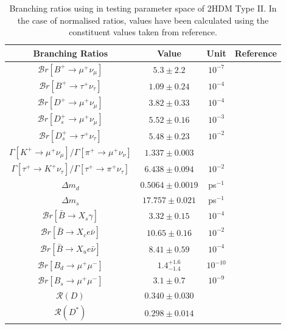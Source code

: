 \documentclass[a4paper,12pt]{article}
\begin{document}
\begin{table}[ht]
    \centering
    \begin{tabular}{c|ccc}
        \hline\hline
        Branching Ratios & Value & Unit & Reference \\
        \hline\hline
        $\mathcal{B}r[B^+\to\mu^+\nu_\mu]$ & $5.3\pm2.2$ & $10^{-7}$ & \\
        $\mathcal{B}r[B^+\to\tau^+\nu_\tau]$ & $1.09\pm0.24$ & $10^{-4}$ & \cite{pdg} \\
        $\mathcal{B}r[D^+\to\mu^+\nu_\mu]$ & $3.82\pm0.33$ & $10^{-4}$ & \cite{pdg} \\
        $\mathcal{B}r[D_s^+\to\mu^+\nu_\mu]$ & $5.52\pm0.16$ & $10^{-3}$ & \cite{pdg} \\
        $\mathcal{B}r[D_s^+\to\tau^+\nu_\tau]$ & $5.48\pm0.23$ & $10^{-2}$ & \cite{pdg} \\
        $\Gamma[K^+\to\mu^+\nu_\mu]/\Gamma[\pi^+\to\mu^+\nu_\nu]$ & $1.337\pm0.003$ & & \cite{pdg}\\
        $\Gamma[\tau^+\to K^+\nu_\tau]/\Gamma[\tau^+\to\pi^+\nu_\tau]$ & $6.438\pm0.094$ & $10^{-2}$ & \cite{pdg} \\
        $\Delta m_d$ & $0.5064\pm0.0019$ & ps$^{-1}$ & \cite{hflav} \\ 
        $\Delta m_s$ & $17.757\pm0.021$ & ps$^{-1}$ & \cite{hflav} \\
        $\mathcal{B}r[\bar{B}\to X_s\gamma]$ & $3.32\pm0.15$ & $10^{-4}$ & \cite{hflav,bmes} \\
        $\mathcal{B}r[\bar{B}\to X_c e\bar{\nu}]$ & $10.65\pm0.16$ & $10^{-2}$ & \cite{hflav,pdg} \\
        $\mathcal{B}r[\bar{B}\to X_ue\bar{\nu}]$ & $8.41\pm0.59$ & $10^{-4}$ & \cite{bxu} \\
        $\mathcal{B}r[B_d\to\mu^+\mu^-]$ & $1.4^{+1.6}_{-1.4}$ & $10^{-10}$ & \cite{pdg} \\
        $\mathcal{B}r[B_s\to\mu^+\mu^-]$ & $3.1\pm0.7$ & $10^{-9}$ & \cite{hflav} \\
        $\mathcal{R}(D)$ & $0.340\pm0.030$ & & \cite{hflav} \\
        $\mathcal{R}(D^*)$ & $0.298\pm0.014$ & & \cite{hflav} \\
        \hline\hline
    \end{tabular}
    \caption{\label{tab:branches}Branching ratios using in testing parameter space of 2HDM Type II. In the case of normalised ratios, values have been calculated using the constituent values taken from reference.}
\end{table}
\end{document}
